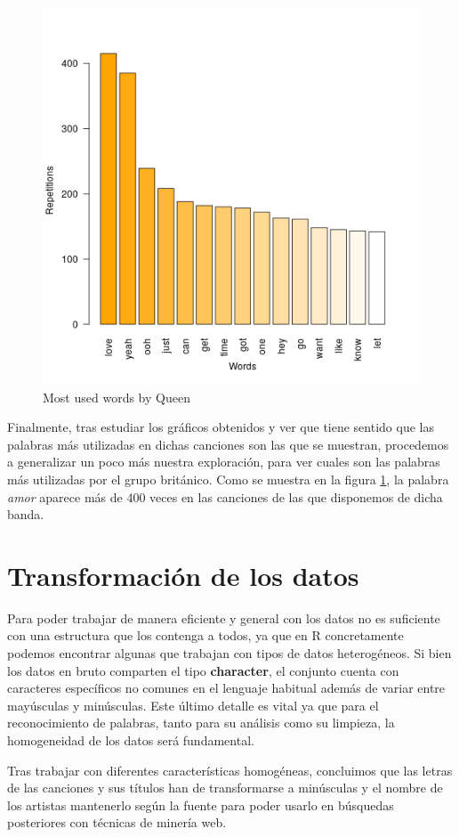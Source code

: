 \begin{figure}[h]
	\centering
	\includegraphics[width=0.7\linewidth]{Imagenes/queen_most_used_words}
	\caption{Most used words by Queen}
	\label{fig:queen_songs}
\end{figure}


Finalmente, tras estudiar los gráficos obtenidos y ver que tiene sentido que las palabras más utilizadas en dichas canciones son las que se muestran, procedemos a generalizar un poco más nuestra exploración, para ver cuales son las palabras más utilizadas por el grupo británico. Como se muestra en la figura \ref{fig:queen_songs}, la palabra \textit{amor} aparece más de 400 veces en las canciones de las que disponemos de dicha banda.


\section{Transformación de los datos}
Para poder trabajar de manera eficiente y general con los datos no es suficiente con una estructura que los contenga a todos, ya que en R concretamente podemos encontrar algunas que trabajan con tipos de datos heterogéneos. Si bien los datos en bruto comparten el tipo \textbf{character}, el conjunto cuenta con caracteres específicos no comunes en el lenguaje habitual además de variar entre mayúsculas y minúsculas. Este último detalle es vital ya que para el reconocimiento de palabras, tanto para su análisis como su limpieza, la homogeneidad de los datos será fundamental.

Tras trabajar con diferentes características homogéneas, concluimos que las letras de las canciones y sus títulos han de transformarse a minúsculas y el nombre de los artistas mantenerlo según la fuente para poder usarlo en búsquedas posteriores con técnicas de minería web.




